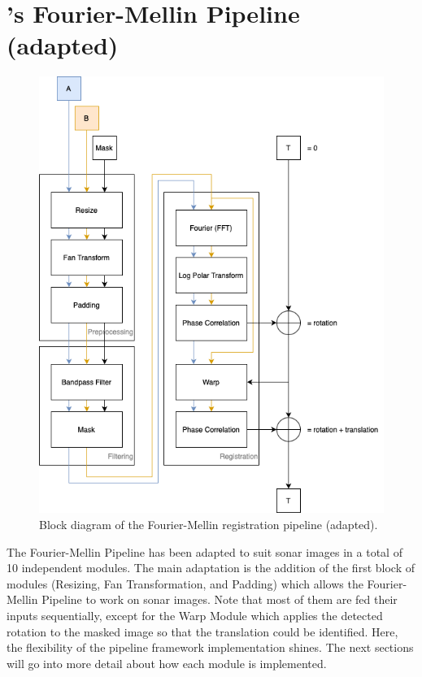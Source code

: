 \section{\citeauthor{Reddy1996}'s Fourier-Mellin Pipeline (adapted)}
\label{sec:fmpipeline}
\begin{figure}[H] 
  \centering
  \includegraphics[width=.9\textwidth]{figures/fourier_mellin_pipeline.png}
  \caption{Block diagram of the Fourier-Mellin registration pipeline (adapted).}
  \label{fig:fmpipeline}
\end{figure}

The Fourier-Mellin Pipeline has been adapted to suit sonar images in a total of 10 independent modules. The main adaptation is the addition of the first block of modules (Resizing, Fan Transformation, and Padding) which allows the Fourier-Mellin Pipeline to work on sonar images. Note that most of them are fed their inputs sequentially, except for the Warp Module which applies the detected rotation to the masked image so that the translation could be identified. Here, the flexibility of the pipeline framework implementation shines. The next sections will go into more detail about how each module is implemented. 

